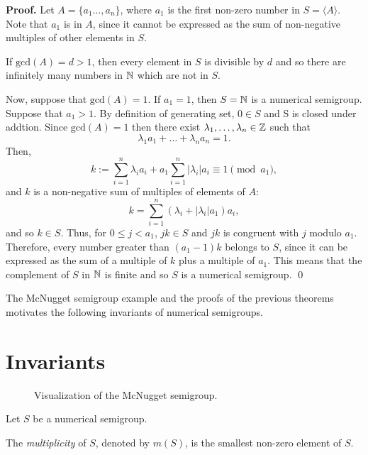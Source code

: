 \textbf{Proof. } Let $A = \{a_{1} \ldots, a_{n}\}$, where $a_1$ is the first non-zero number in $S = \langle A \rangle$. Note that $a_1$ is in $A$, since it cannot be expressed as the sum of non-negative multiples of other elements in $S$. \par
If $\mathrm{gcd}(A) = d > 1$, then every element in $S$ is divisible by $d$ and so there are infinitely many numbers in $\mathbb{N}$ which are not in $S$. \par
Now, suppose that $\mathrm{gcd}(A) = 1$. If $a_1 = 1$, then $S = \mathbb{N}$ is a numerical semigroup. Suppose that $a_1 > 1$. By definition of generating set, $0 \in S$ and S is closed under addtion. Since $\mathrm{gcd}(A) = 1$ then there exist $\lambda_1, \ldots, \lambda_n \in \mathbb{Z}$ such that 
\[\lambda_1a_1 + \ldots + \lambda_na_n = 1.\]
Then, 
\[
    k := \sum_{i = 1}^n \lambda_ia_i + a_1\sum_{i = 1}^n|\lambda_i|a_i \equiv 1 \pmod a_1,
\]
and $k$ is a non-negative sum of multiples of elements of $A$: 
\[k = \sum_{i = 1}^n (\lambda_i + |\lambda_i|a_1)a_i,\]
and so $k \in S$. Thus, for $0 \leq j < a_1$, $jk \in S$ and $jk$ is congruent with $j$ modulo $a_1$. Therefore, every number greater than $(a_1 - 1)k$ belongs to $S$, since it can be expressed as the sum of a multiple of $k$ plus a multiple of $a_1$.  This means that the complement of $S$ in $\mathbb{N}$ is finite and so $S$ is a numerical semigroup. \qed \par

The McNugget semigroup example and the proofs of the previous theorems motivates the following invariants of numerical semigroups. \par 

\section{Invariants}\label{sec:smgps:invariants}

\begin{figure}
    \centering
    
    \caption{Visualization of the McNugget semigroup.}
    \label{fig:smgps:mcnugget}
\end{figure}

Let $S$ be a numerical semigroup. \par

\begin{definition}\label{def:smgps:multiplicity}
    The \textit{multiplicity} of $S$, denoted by $m(S)$, is the smallest non-zero element of $S$.
\end{definition}

